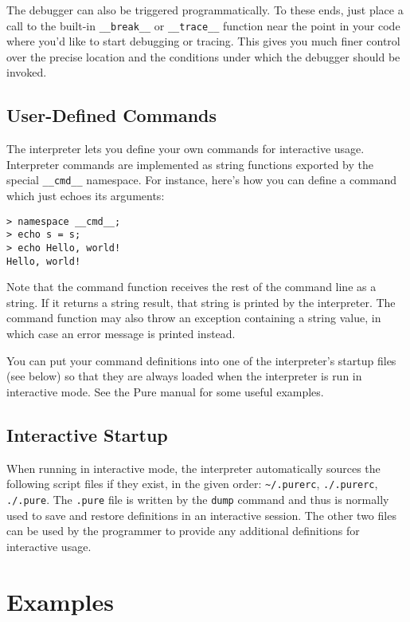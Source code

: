 \documentclass[a4paper,12pt]{article}
\begin{document}
The debugger can also be triggered programmatically. To these ends, just place a call to the built-in \verb|__break__| or \verb|__trace__| function near the point in your code where you'd like to start debugging or tracing. This gives you much finer control over the precise location and the conditions under which the debugger should be invoked.

\subsection{User-Defined Commands}

The interpreter lets you define your own commands for interactive usage. Interpreter commands are implemented as string functions exported by the special \verb|__cmd__| namespace. For instance, here's how you can define a command which just echoes its arguments:

\begin{lstlisting}
> namespace __cmd__;
> echo s = s;
> echo Hello, world!
Hello, world!
\end{lstlisting}

Note that the command function receives the rest of the command line as a string. If it returns a string result, that string is printed by the interpreter. The command function may also throw an exception containing a string value, in which case an error message is printed instead.

You can put your command definitions into one of the interpreter's startup files (see below) so that they are always loaded when the interpreter is run in interactive mode. See the Pure manual for some useful examples.

\subsection{Interactive Startup}

When running in interactive mode, the interpreter automatically sources the following script files if they exist, in the given order: \verb|~/.purerc|, \verb|./.purerc|, \verb|./.pure|. The \verb|.pure| file is written by the \verb|dump| command and thus is normally used to save and restore definitions in an interactive session. The other two files can be used by the programmer to provide any additional definitions for interactive usage.

\section{Examples}
\label{Examples}
\end{document}
